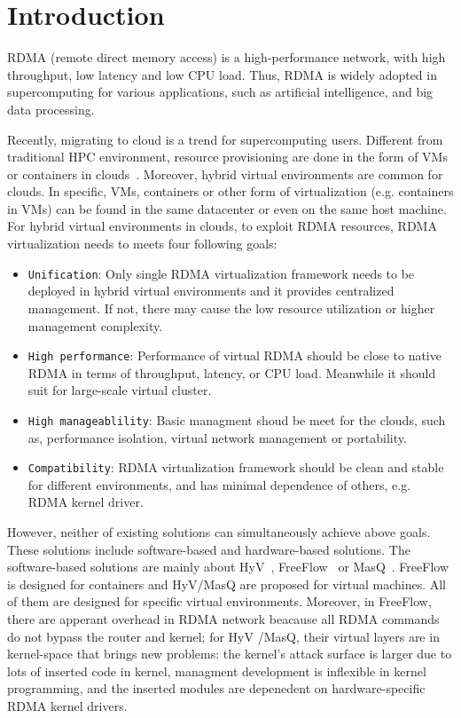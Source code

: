\section{Introduction}
RDMA (remote direct memory access) is a high-performance network,  with high throughput, low latency and low CPU load. Thus, RDMA is widely adopted in supercomputing for various applications,  such as artificial intelligence, and big data processing. 

Recently, migrating to cloud is a trend for supercomputing users. Different from traditional HPC environment, resource provisioning are done in the form of VMs or containers in clouds~\cite{hpc-cloud}. Moreover, hybrid virtual environments are common for clouds. In specific, VMs, containers or other form of virtualization (e.g. containers in VMs) can be found in the same datacenter or even on the same host machine. For hybrid virtual environments in clouds,  to exploit RDMA resources, RDMA virtualization needs to meets four following goals:

\begin{itemize}
	\item {\verb|Unification|}: Only single RDMA virtualization framework needs to be deployed in hybrid virtual environments and it provides centralized management. If not, there may cause the low resource utilization or higher management complexity.
	\item {\verb|High performance|}: Performance of virtual RDMA should be close to native RDMA in terms of throughput, latency, or CPU load. Meanwhile it should suit for large-scale virtual cluster.
	\item {\verb|High manageablility|}: Basic managment shoud be meet for the clouds, such as, performance isolation, virtual network management or portability.
	\item {\verb|Compatibility|}: RDMA virtualization framework should be clean and stable for different environments, and has minimal dependence of others, e.g. RDMA kernel driver.
\end{itemize}

However, neither of existing solutions can simultaneously achieve above goals. These solutions include software-based and hardware-based solutions. The software-based solutions are mainly about HyV~\cite{pfefferle2015hybrid}, FreeFlow~\cite{kim2019freeflow} or MasQ~\cite{he2020masq}. FreeFlow is  designed for containers and HyV/MasQ are proposed for virtual machines. All of them are designed for specific virtual environments. Moreover, in FreeFlow, there are apperant overhead in RDMA network beacause all RDMA commands do not bypass the router and kernel; for HyV /MasQ, their virtual layers are in kernel-space that brings new problems: the kernel's attack surface is larger due to lots of inserted code in kernel, managment development is inflexible in kernel programming, and the inserted modules are depenedent on hardware-specific RDMA kernel drivers.

